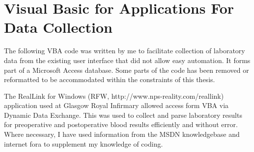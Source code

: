 \chapter{Visual Basic for Applications For Data Collection}
\label{AppendixAccessDatabase}
\clearpage


The following VBA code was written by me to facilitate collection of laboratory data from the existing user interface that did not allow easy automation. It forms part of a Microsoft Access database. Some parts of the code has been removed or reformatted to be accommodated within the constraints of this thesis.

The RealLink for Windows (RFW, http://www.nps-reality.com/reallink) application used at Glasgow Royal Infirmary allowed access form VBA via Dynamic Data Exchange. This was used to collect and parse laboratory results for preoperative and postoperative blood results efficiently and without error. Where necessary, I have used information from the MSDN knowledgebase and internet fora to supplement my knowledge of coding.

